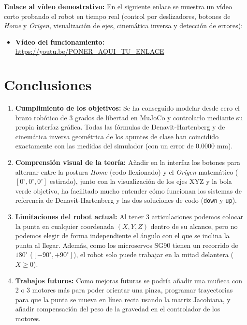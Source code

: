 \documentclass[11pt,a4paper]{article}
\begin{document}
\textbf{Enlace al vídeo demostrativo:}
En el siguiente enlace se muestra un vídeo corto probando el robot en tiempo real (control por deslizadores, botones de \textit{Home} y \textit{Origen}, visualización de ejes, cinemática inversa y detección de errores):
\begin{itemize}
    \item \textbf{Vídeo del funcionamiento:} \url{https://youtu.be/PONER_AQUI_TU_ENLACE}
\end{itemize}

\section{Conclusiones}

\begin{enumerate}
    \item \textbf{Cumplimiento de los objetivos:} Se ha conseguido modelar desde cero el brazo robótico de 3 grados de libertad en MuJoCo y controlarlo mediante su propia interfaz gráfica. Todas las fórmulas de Denavit-Hartenberg y de cinemática inversa geométrica de los apuntes de clase han coincidido exactamente con las medidas del simulador (con un error de $0.0000\text{ mm}$).
    \item \textbf{Comprensión visual de la teoría:} Añadir en la interfaz los botones para alternar entre la postura \textit{Home} (codo flexionado) y el \textit{Origen} matemático ($[0^\circ, 0^\circ, 0^\circ]$ estirado), junto con la visualización de los ejes XYZ y la bola verde objetivo, ha facilitado mucho entender cómo funcionan los sistemas de referencia de Denavit-Hartenberg y las dos soluciones de codo (\texttt{down} y \texttt{up}).
    \item \textbf{Limitaciones del robot actual:} Al tener 3 articulaciones podemos colocar la punta en cualquier coordenada $(X, Y, Z)$ dentro de su alcance, pero no podemos elegir de forma independiente el ángulo con el que se inclina la punta al llegar. Además, como los microservos SG90 tienen un recorrido de $180^\circ$ ($[-90^\circ, +90^\circ]$), el robot solo puede trabajar en la mitad delantera ($X \ge 0$).
    \item \textbf{Trabajos futuros:} Como mejoras futuras se podría añadir una muñeca con 2 o 3 motores más para poder orientar una pinza, programar trayectorias para que la punta se mueva en línea recta usando la matriz Jacobiana, y añadir compensación del peso de la gravedad en el controlador de los motores.
\end{enumerate}
\end{document}
